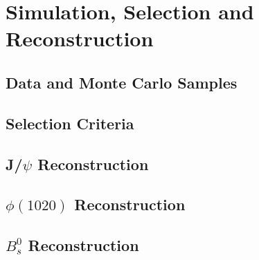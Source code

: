 \chapter[\leavevmode\newline Simulation, Selection and Reconstruction]{Simulation, Selection and Reconstruction}
\label{chap:Chapter_3}
\section{Data and Monte Carlo Samples}
\section{Selection Criteria}%
\section{J/$\psi$ Reconstruction}
\section{$\phi(1020)$ Reconstruction}
\section{$B_s^0$ Reconstruction}
\lipsum[3]